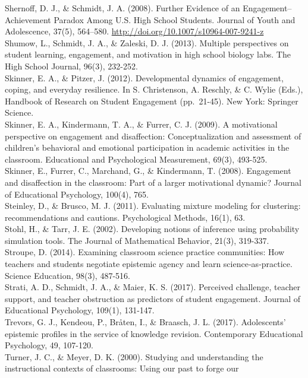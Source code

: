 \documentclass[]{msu-thesis}
\theoremstyle{definition}
\theoremstyle{definition}
\theoremstyle{definition}
\theoremstyle{remark}
\begin{document}
Shernoff, D. J., \& Schmidt, J. A. (2008). Further Evidence of an
Engagement--Achievement Paradox Among U.S. High School Students. Journal
of Youth and Adolescence, 37(5), 564--580.
\url{http://doi.org/10.1007/s10964-007-9241-z}\\
Shumow, L., Schmidt, J. A., \& Zaleski, D. J. (2013). Multiple
perspectives on student learning, engagement, and motivation in high
school biology labs. The High School Journal, 96(3), 232-252.\\
Skinner, E. A., \& Pitzer, J. (2012). Developmental dynamics of
engagement, coping, and everyday resilience. In S. Christenson, A.
Reschly, \& C. Wylie (Eds.), Handbook of Research on Student Engagement
(pp.~21-45). New York: Springer Science.\\
Skinner, E. A., Kindermann, T. A., \& Furrer, C. J. (2009). A
motivational perspective on engagement and disaffection:
Conceptualization and assessment of children's behavioral and emotional
participation in academic activities in the classroom. Educational and
Psychological Measurement, 69(3), 493-525.\\
Skinner, E., Furrer, C., Marchand, G., \& Kindermann, T. (2008).
Engagement and disaffection in the classroom: Part of a larger
motivational dynamic? Journal of Educational Psychology, 100(4), 765.\\
Steinley, D., \& Brusco, M. J. (2011). Evaluating mixture modeling for
clustering: recommendations and cautions. Psychological Methods, 16(1),
63.\\
Stohl, H., \& Tarr, J. E. (2002). Developing notions of inference using
probability simulation tools. The Journal of Mathematical Behavior,
21(3), 319-337.\\
Stroupe, D. (2014). Examining classroom science practice communities:
How teachers and students negotiate epistemic agency and learn
science‐as‐practice. Science Education, 98(3), 487-516.\\
Strati, A. D., Schmidt, J. A., \& Maier, K. S. (2017). Perceived
challenge, teacher support, and teacher obstruction as predictors of
student engagement. Journal of Educational Psychology, 109(1),
131-147.\\
Trevors, G. J., Kendeou, P., Bråten, I., \& Braasch, J. L. (2017).
Adolescents' epistemic profiles in the service of knowledge revision.
Contemporary Educational Psychology, 49, 107-120.\\
Turner, J. C., \& Meyer, D. K. (2000). Studying and understanding the
instructional contexts of classrooms: Using our past to forge our
\end{document}
